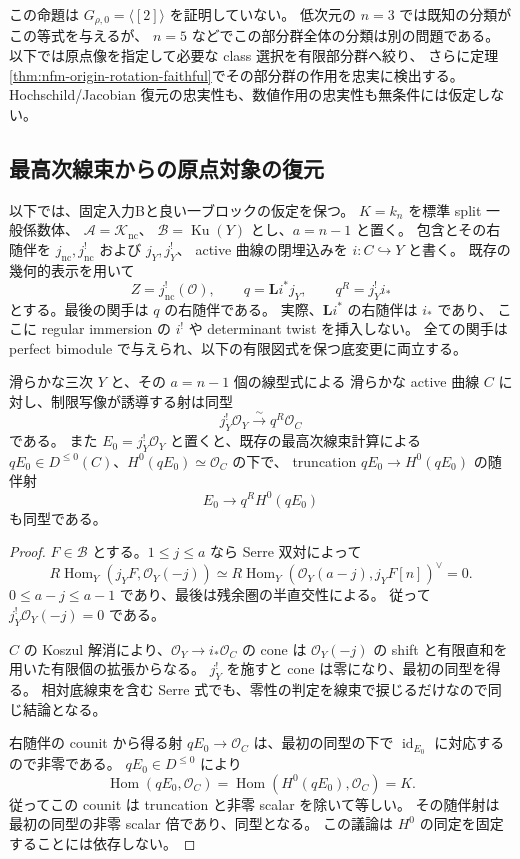 この命題は $G_{\rho,0}=\langle[2]\rangle$ を証明していない。
低次元の $n=3$ では既知の分類がこの等式を与えるが、
$n=5$ などでこの部分群全体の分類は別の問題である。
以下では原点像を指定して必要な class 選択を有限部分群へ絞り、
さらに定理\ref{thm:nfm-origin-rotation-faithful}でその部分群の作用を忠実に検出する。
Hochschild/Jacobian 復元の忠実性も、数値作用の忠実性も無条件には仮定しない。

\subsection{最高次線束からの原点対象の復元}

以下では、固定入力Bと良い一ブロックの仮定を保つ。
$K=k_n$ を標準 split 一般係数体、
$\mathcal A=\mathcal K_{\mathrm{nc}}$、
$\mathcal B=\operatorname{Ku}(Y)$ とし、$a=n-1$ と置く。
包含とその右随伴を $j_{\mathrm{nc}},j_{\mathrm{nc}}^!$ および $j_Y,j_Y^!$、
active 曲線の閉埋込みを $i:C\hookrightarrow Y$ と書く。
既存の幾何的表示を用いて
\[
 Z=j_{\mathrm{nc}}^!(\mathcal O),\qquad
 q=\mathbf Li^*j_Y,\qquad q^R=j_Y^!i_*
\]
とする。最後の関手は $q$ の右随伴である。
実際、$\mathbf Li^*$ の右随伴は $i_*$ であり、
ここに regular immersion の $i^!$ や determinant twist を挿入しない。
全ての関手は perfect bimodule で与えられ、以下の有限図式を保つ底変更に両立する。

\begin{lemma}[線型切断上の構造層の右随伴像]
\label{lem:nfm-origin-active-right-adjoint}
滑らかな三次 $Y$ と、その $a=n-1$ 個の線型式による
滑らかな active 曲線 $C$ に対し、制限写像が誘導する射は同型
\[
 j_Y^!\mathcal O_Y\xrightarrow{\sim}q^R\mathcal O_C
\]
である。
また $E_0=j_Y^!\mathcal O_Y$ と置くと、既存の最高次線束計算による
$qE_0\in D^{\le0}(C)$、$H^0(qE_0)\simeq\mathcal O_C$ の下で、
truncation $qE_0\to H^0(qE_0)$ の随伴射
\[
 E_0\longrightarrow q^R H^0(qE_0)
\]
も同型である。
\end{lemma}

\begin{proof}
$F\in\mathcal B$ とする。$1\le j\le a$ なら Serre 双対によって
\[
 R\operatorname{Hom}_Y(j_YF,\mathcal O_Y(-j))
 \simeq
 R\operatorname{Hom}_Y(\mathcal O_Y(a-j),j_YF[n])^\vee=0.
\]
$0\le a-j\le a-1$ であり、最後は残余圏の半直交性による。
従って $j_Y^!\mathcal O_Y(-j)=0$ である。

$C$ の Koszul 解消により、$\mathcal O_Y\to i_*\mathcal O_C$ の cone は
$\mathcal O_Y(-j)$ の shift と有限直和を用いた有限個の拡張からなる。
$j_Y^!$ を施すと cone は零になり、最初の同型を得る。
相対底線束を含む Serre 式でも、零性の判定を線束で捩じるだけなので同じ結論となる。

右随伴の counit から得る射 $qE_0\to\mathcal O_C$ は、最初の同型の下で
$\operatorname{id}_{E_0}$ に対応するので非零である。
$qE_0\in D^{\le0}$ により
\[
 \operatorname{Hom}(qE_0,\mathcal O_C)
  =\operatorname{Hom}(H^0(qE_0),\mathcal O_C)=K.
\]
従ってこの counit は truncation と非零 scalar を除いて等しい。
その随伴射は最初の同型の非零 scalar 倍であり、同型となる。
この議論は $H^0$ の同定を固定することには依存しない。
\end{proof}

